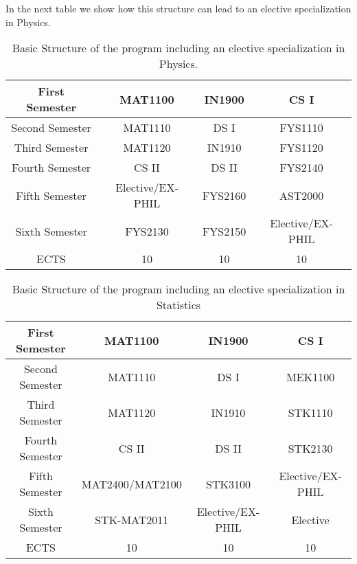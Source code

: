 \documentclass[oneside,final,10pt]{article}
\begin{document}
In the next table we show how this structure can lead to an elective specialization in Physics.

\begin{table}[hbtp]
 \caption{Basic Structure of the program including an elective specialization in Physics. }
    \centering
    \begin{tabular}{|c|c|c|c|} \hline
    First Semester & MAT1100 &  IN1900   & CS I \\ \hline 
    Second Semester & MAT1110 &  DS I   & FYS1110 \\ \hline
    Third Semester & MAT1120 &  IN1910   & FYS1120 \\ \hline
    Fourth Semester & CS II & DS II    & FYS2140 \\ \hline       
    Fifth Semester & Elective/EX-PHIL & FYS2160     & AST2000 \\ \hline
    Sixth Semester & FYS2130 & FYS2150    & Elective/EX-PHIL \\ \hline
   ECTS & 10 &  10   &  10  \\ \hline    
    \end{tabular}
   
\end{table}

\begin{table}[hbpt]
    \caption{Basic Structure of the program including an elective specialization in Statistics}
    \centering
    \begin{tabular}{|c|c|c|c|} \hline
    First Semester & MAT1100 &  IN1900   & CS I \\ \hline 
    Second Semester & MAT1110 &  DS I   & MEK1100 \\ \hline
    Third Semester & MAT1120 &  IN1910   &  STK1110\\ \hline
    Fourth Semester & CS II & DS II    & STK2130 \\ \hline       
    Fifth Semester & MAT2400/MAT2100 & STK3100     & Elective/EX-PHIL \\ \hline
    Sixth Semester &  STK-MAT2011    & Elective/EX-PHIL & Elective \\ \hline
   ECTS & 10 &  10   &  10  \\ \hline    
    \end{tabular}

\end{table}
\end{document}
